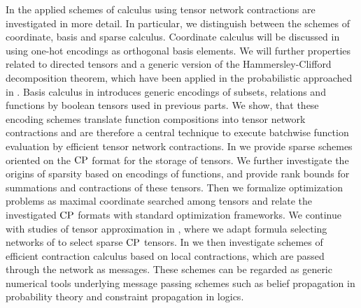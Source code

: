 In  the applied schemes of calculus using tensor network contractions are investigated in more detail.
In particular, we distinguish between the schemes of coordinate, basis and sparse calculus.%
Coordinate calculus will be discussed in  using one-hot encodings as orthogonal basis elements.
We will further properties related to directed tensors and a generic version of the Hammersley-Clifford decomposition theorem, which have been applied in the probabilistic approached in .
Basis calculus in  introduces generic encodings of subsets, relations and functions by boolean tensors used in previous parts.
We show, that these encoding schemes translate function compositions into tensor network contractions and are therefore a central technique to execute batchwise function evaluation by efficient tensor network contractions.
In  we provide sparse schemes oriented on the $\mathrm{CP}$ format for the storage of tensors.
We further investigate the origins of sparsity based on encodings of functions, and provide rank bounds for summations and contractions of these tensors.
Then we formalize optimization problems as maximal coordinate searched among tensors and relate the investigated $\mathrm{CP}$ formats with standard optimization frameworks.
We continue with studies of tensor approximation in , where we adapt formula selecting networks of  to select sparse $\mathrm{CP}$ tensors.
In  we then investigate schemes of efficient contraction calculus based on local contractions, which are passed through the network as messages.
These schemes can be regarded as generic numerical tools underlying message passing schemes such as belief propagation in probability theory and constraint propagation in logics.

